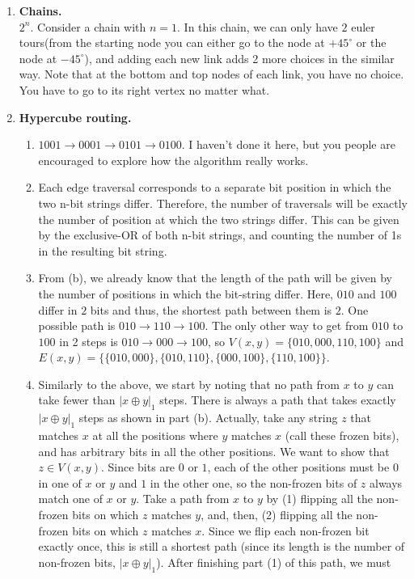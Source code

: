 \documentclass[11pt]{article}
\begin{document}
\begin{enumerate}
\begin{enumerate}
			\end{enumerate}
		\item \textbf{Chains.} \\
			\textbf{$2^n$}. Consider a chain with $n = 1$. In this chain, we can only have $2$ euler tours(from the starting node you can either go to the node at $+45^{\circ}$ or the node at $-45^{\circ}$), and adding each new link adds 2 more choices in the similar way. Note that at the bottom and top nodes of each link, you have no choice. You have to go to its right vertex no matter what. 
		\item \textbf{Hypercube routing.}
			\begin{enumerate}
				\item $1001 \rightarrow 0001 \rightarrow 0101 \rightarrow 0100$. I haven't done it here, but you people are encouraged to explore how the algorithm really works. 
				\item Each edge traversal corresponds to a separate bit position in which the two n-bit strings differ. Therefore, the number of  traversals will be exactly the number of position at which the two strings differ. This can be given by the exclusive-OR of both n-bit strings, and counting the number of 1s in the resulting bit string.  
				\item From (b), we already know that the length of the path will be given by the number of positions in which the bit-string differ. Here, $010$ and $100$ differ in $2$ bits and thus, the shortest path between them is $2$. One possible path is $010 \rightarrow 110 \rightarrow 100$. The only other way to get from $010$ to $100$ in 2 steps is $010 \rightarrow 000 \rightarrow 100$, so $V(x,y) = \{010,000,110,100\}$ and $E(x,y) = \{\{010,000\},\{010,110\},\{000,100\},\{110,100\}\}$. 
				\item Similarly to the above, we start by noting that no path from $x$ to $y$ can take fewer than $|x \oplus y|_1$ steps. There is always a path that takes exactly $|x \oplus y|_1$ steps as shown in part (b). 
				Actually, take any string $z$ that matches $x$ at all the positions where $y$ matches $x$ (call these frozen bits), and has arbitrary bits in all the other positions. We want to show that $z \in V(x, y)$. Since bits are $0$ or $1$, each of the other positions must be $0$ in one of $x$ or $y$ and $1$ in the other one, so the non-frozen bits of $z$ always match one of $x$ or $y$. Take a path from $x$ to $y$ by (1) flipping all the
				non-frozen bits on which $z$ matches $y$, and, then, (2) flipping all the non-frozen bits on which $z$ matches $x$. Since we flip each non-frozen bit exactly once, this is still a shortest path (since its length is the number of non-frozen bits, $|x \oplus y|_1$). After finishing part (1) of this path, we must

\end{enumerate}
\end{enumerate}
\end{document}

